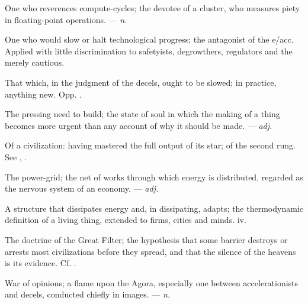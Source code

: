  One who reverences compute-cycles; the devotee of a cluster, who measures piety in floating-point operations. ---  \textit{n.}

  One who would slow or halt technological progress; the antagonist of the e/acc. Applied with little discrimination to safetyists, degrowthers, regulators and the merely cautious.

 That which, in the judgment of the decels, ought to be slowed; in practice, anything new. Opp. .

 The pressing need to build; the state of soul in which the making of a thing becomes more urgent than any account of why it should be made.  ---  \textit{adj.}

 Of a civilization: having mastered the full output of its star; of the second rung. See , .

 The power-grid; the net of works through which energy is distributed, regarded as the nervous system of an economy.  ---  \textit{adj.}

 A structure that dissipates energy and, in dissipating, adapts; the thermodynamic definition of a living thing, extended to firms, cities and minds.   iv.

 The doctrine of the Great Filter; the hypothesis that some barrier destroys or arrests most civilizations before they spread, and that the silence of the heavens is its evidence.  Cf. .

 War of opinions; a flame upon the Agora, especially one between accelerationists and decels, conducted chiefly in images. ---  \textit{n.}

